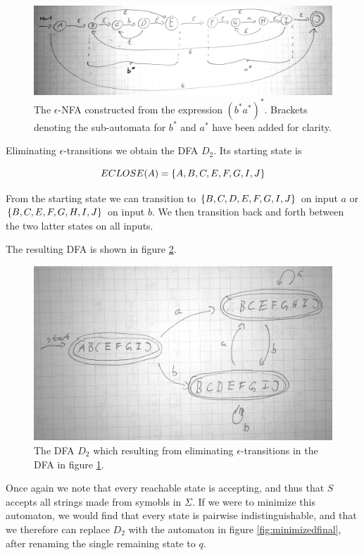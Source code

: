\documentclass{article}
\begin{document}
\begin{figure}[htpb]
    \centering
    \includegraphics[width=\linewidth]{bastar}
    \caption{The $\epsilon$-NFA constructed from the expression $(b^*a^*)^*$. Brackets denoting the sub-automata for $b^*$ and $a^*$ have been added for clarity.}
    \label{fig:bastar}
\end{figure}


Eliminating $\epsilon$-transitions we obtain the DFA $D_2$. Its starting state is

$$ECLOSE(A) = \set{A,B,C,E,F,G,I,J}$$

From the starting state we can transition to $\set{B,C,D,E,F,G,I,J}$ on input $a$ or $\set{B,C,E,F,G,H,I,J}$ on input $b$. We then transition back and forth between the two latter states on all inputs.

The resulting DFA is shown in figure \ref{fig:bastarmin}.

\begin{figure}[htpb]
    \centering
    \includegraphics[width=0.8\linewidth]{bastarmin}
    \caption{The DFA $D_2$ which resulting from eliminating $\epsilon$-transitions in the DFA in figure \ref{fig:bastar}.}
    \label{fig:bastarmin}
\end{figure}

Once again we note that every reachable state is accepting, and thus that $S$ accepts all strings made from symobls in $\Sigma$. If we were to minimize this automaton, we would find that every state is pairwise indistinguishable, and that we therefore can replace $D_2$ with the automaton in figure \ref{fig:minimizedfinal}, after renaming the single remaining state to $q$.
\end{document}

